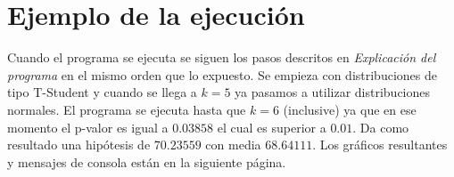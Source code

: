 
\section{Ejemplo de la ejecución}

Cuando el programa se ejecuta se siguen los pasos descritos en \textit{Explicación del programa} en el mismo orden que lo expuesto. Se empieza con distribuciones de tipo T-Student y cuando se llega a $k = 5$ ya pasamos a utilizar distribuciones normales. El programa se ejecuta hasta que $k = 6$ (inclusive) ya que en ese momento el p-valor es igual a $0.03858$ el cual es superior a $0.01$. Da como resultado una hipótesis de $70.23559$ con media $68.64111$. Los gráficos resultantes y mensajes de consola están en la siguiente página.

